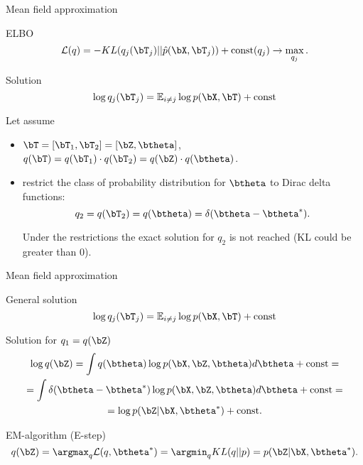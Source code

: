 \begin{frame}{Mean field approximation}
	\begin{block}{ELBO}
		\[
			\mathcal{L} (q) = - KL (q_j(\bT_j) || \hat{p}(\bX, \bT_j))  + \text{const}(q_j) \rightarrow \max_{q_j}.
		\]
		\vspace{-0.3cm}
	\end{block}
	\begin{block}{Solution}
		\vspace{-0.3cm}
		\[
			\log q_j(\bT_j) = \mathbb{E}_{i \neq j} \log p(\bX, \bT) + \text{const}
		\]
		\vspace{-0.3cm}
	\end{block}
	Let assume 
	\begin{itemize}
		\item $\bT = [\bT_1, \bT_2] = [\bZ, \btheta]$, $q(\bT) = q(\bT_1) \cdot q(\bT_2) = q(\bZ) \cdot q(\btheta)$.
		\item restrict the class of probability distribution for $\btheta$ to Dirac delta functions:
		\[
			q_2 = q(\bT_2) = q(\btheta) = \delta(\btheta - \btheta^*).
		\]
		
		Under the restrictions the exact solution for $q_2$ is not reached (KL could be greater than 0).
	\end{itemize}
\end{frame}
\begin{frame}{Mean field approximation}
	\begin{block}{General solution}
		\vspace{-0.3cm}
		\[
		\log q_j(\bT_j) = \mathbb{E}_{i \neq j} \log p(\bX, \bT) + \text{const}
		\]
		\vspace{-0.3cm}
	\end{block}
	\begin{block}{Solution for $q_1 = q(\bZ)$}
		\vspace{-0.3cm}
		\begin{multline*}
			\log q(\bZ) = \int q(\btheta) \log p(\bX, \bZ,  \btheta) d\btheta + \text{const} = \\
			= \int \delta(\btheta - \btheta^*) \log p(\bX, \bZ,  \btheta) d\btheta + \text{const} = \\
			= \log p (\bZ | \bX, \btheta^*) +  \text{const}.
		\end{multline*}
	\end{block}
	\vspace{-0.3cm}
	\begin{block}{EM-algorithm (E-step)}
		\vspace{-0.3cm}
	\[
		q(\bZ) = \argmax_q \mathcal{L} (q, \btheta^*) = \argmin_q KL(q || p) = p(\bZ| \bX, \btheta^*).
	\]
	\end{block}
\end{frame}
